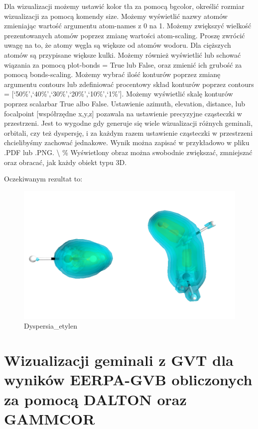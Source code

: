 \documentclass[11pt]{article}
\begin{document}
    Dla wizualizacji możemy ustawić kolor tła za pomocą bgcolor, określić
rozmiar wizualizacji za pomocą komendy size. Możemy wyświetlić nazwy
atomów zmieniając wartość argumentu atom-names z 0 na 1. Możemy
zwiększyć wielkość prezentowanych atomów poprzez zmianę wartości
atom-scaling. Proszę zwrócić uwagę na to, że atomy węgla są większe od
atomów wodoru. Dla cięższych atomów są przypisane większe kulki. Możemy
również wyświetlić lub schować wiązania za pomocą plot-bonds = True lub
False, oraz zmienić ich grubość za pomocą bonds-scaling. Możemy wybrać
ilość konturów poprzez zmianę argumentu contours lub zdefiniować
procentowy skład konturów poprzez contours =
{[}`50\%',`40\%',`30\%',`20\%',`10\%',`1\%'{]}. Możemy wyświetlić skalę
konturów poprzez scalarbar True albo False. Ustawienie azimuth,
elevation, distance, lub focalpoint {[}współrzędne x,y,z{]} pozawala na
ustawienie precyzyjne cząsteczki w przestrzeni. Jest to wygodne gdy
generuje się wiele wizualizacji różnych geminali, orbitali, czy też
dyspersję, i za każdym razem ustawienie cząsteczki w przestrzeni
chcielibyśmy zachować jednakowe. Wynik można zapisać w przykładowo w
pliku .PDF lub .PNG. \textbackslash{} \% Wyświetlony obraz można
swobodnie zwiększać, zmniejszać oraz obracać, jak każdy obiekt typu 3D.

    Oczekiwanym rezultat to:

\begin{figure}
\centering
\includegraphics{Examples/C2H4_C2H4/Dyspersja_etylen.png}
\caption{Dyspersia\_etylen}
\end{figure}

    \hypertarget{wizualizacji-geminali-z-gvt-dla-wynikuxf3w-eerpa-gvb-obliczonych-za-pomocux105-dalton-oraz-gammcor}{%
\section{Wizualizacji geminali z GVT dla wyników EERPA-GVB obliczonych
za pomocą DALTON oraz
GAMMCOR}\label{wizualizacji-geminali-z-gvt-dla-wynikuxf3w-eerpa-gvb-obliczonych-za-pomocux105-dalton-oraz-gammcor}}
\end{document}
